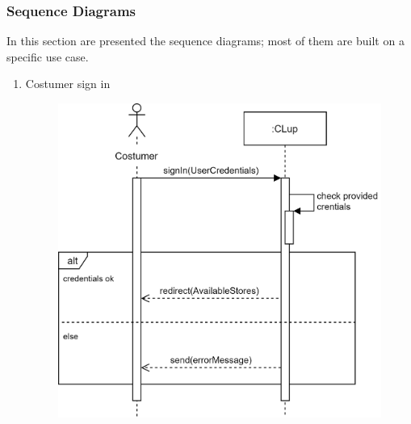 \documentclass[]{article}
\begin{document}
			\subsubsection{Sequence Diagrams}
			In this section are presented the sequence diagrams; most of them are built on a specific use case.
			
			\bigskip\bigskip\bigskip
						\begin{enumerate}
							
							\item Costumer sign in
						\begin{figure}[H]
							\centering
							\includegraphics[scale=1.1]{login.png}
							\caption{}
							\label{fig:sign-in_sequencediagramm}
						\end{figure}
						\newpage
						

\end{enumerate}
\end{document}
